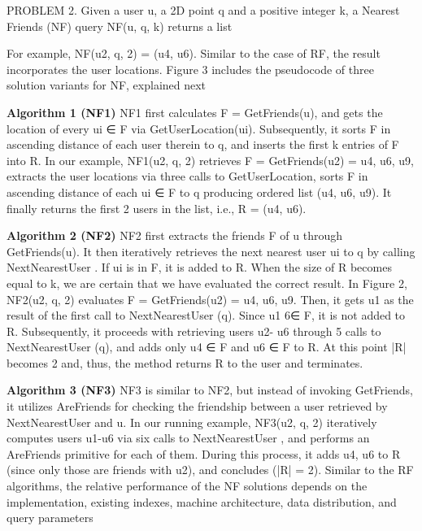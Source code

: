 \documentclass[prodmode,acmtods]{acmsmall} %
\begin{document}
PROBLEM 2. Given a user u, a 2D point q and a positive integer
k, a Nearest Friends (NF) query NF(u, q, k) returns a list

For example, NF(u2, q, 2) = (u4, u6). Similar to the case of
RF, the result incorporates the user locations. Figure 3 includes the
pseudocode of three solution variants for NF, explained next

\textbf{Algorithm 1 (NF1)}
NF1 first calculates F = GetFriends(u),
and gets the location of every ui ∈ F via GetUserLocation(ui).
Subsequently, it sorts F in ascending distance of each user therein
to q, and inserts the first k entries of F into R. In our example,
NF1(u2, q, 2) retrieves F = GetFriends(u2) = {u4, u6, u9},
extracts the user locations via three calls to GetUserLocation,
sorts F in ascending distance of each ui ∈ F to q producing ordered
list (u4, u6, u9). It finally returns the first 2 users in the list,
i.e., R = (u4, u6).

\textbf{Algorithm 2 (NF2)}
 NF2 first extracts the friends F of u through
GetFriends(u). It then iteratively retrieves the next nearest user ui
to q by calling NextNearestUser . If ui is in F, it is added to R.
When the size of R becomes equal to k, we are certain that we have
evaluated the correct result. In Figure 2, NF2(u2, q, 2) evaluates
F = GetFriends(u2) = {u4, u6, u9}. Then, it gets u1 as the
result of the first call to NextNearestUser (q). Since u1 6∈ F, it is
not added to R. Subsequently, it proceeds with retrieving users u2-
u6 through 5 calls to NextNearestUser (q), and adds only u4 ∈ F
and u6 ∈ F to R. At this point |R| becomes 2 and, thus, the
method returns R to the user and terminates.

\textbf{Algorithm 3 (NF3)}
NF3 is similar to NF2, but instead of invoking
GetFriends, it utilizes AreFriends for checking the friendship
between a user retrieved by NextNearestUser and u. In our running
example, NF3(u2, q, 2) iteratively computes users u1-u6 via
six calls to NextNearestUser , and performs an AreFriends primitive
for each of them. During this process, it adds u4, u6 to R
(since only those are friends with u2), and concludes (|R| = 2).
Similar to the RF algorithms, the relative performance of the
NF solutions depends on the implementation, existing indexes, machine
architecture, data distribution, and query parameters
\end{document}
